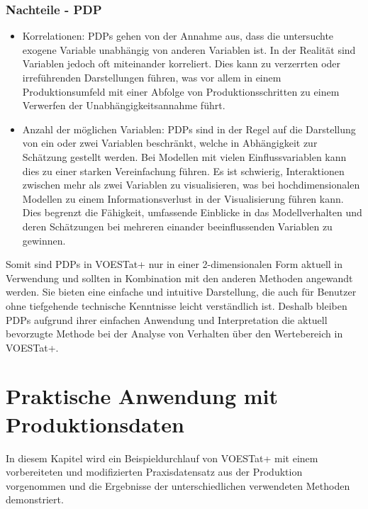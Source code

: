 \documentclass[12pt,titlepage,oneside]{book}
\begin{document}
\subsection{Nachteile - PDP}
\begin{itemize}
    \item Korrelationen: PDPs gehen von der Annahme aus, dass die untersuchte exogene Variable unabhängig von anderen Variablen ist. In der Realität sind Variablen jedoch oft miteinander korreliert. Dies kann zu verzerrten oder irreführenden Darstellungen führen, was vor allem in einem Produktionsumfeld mit einer Abfolge von Produktionsschritten zu einem Verwerfen der Unabhängigkeitsannahme führt. 
    \item Anzahl der möglichen Variablen: PDPs sind in der Regel auf die Darstellung von ein oder zwei Variablen beschränkt, welche in Abhängigkeit zur Schätzung gestellt werden. Bei Modellen mit vielen Einflussvariablen kann dies zu einer starken Vereinfachung führen. Es ist schwierig, Interaktionen zwischen mehr als zwei Variablen zu visualisieren, was bei hochdimensionalen Modellen zu einem Informationsverlust in der Visualisierung führen kann. Dies begrenzt die Fähigkeit, umfassende Einblicke in das Modellverhalten und deren Schätzungen bei mehreren einander beeinflussenden Variablen zu gewinnen.

\end{itemize}
Somit sind PDPs in VOESTat+ nur in einer 2-dimensionalen Form aktuell in Verwendung und sollten in Kombination mit den anderen Methoden angewandt werden. Sie bieten eine einfache und intuitive Darstellung, die auch für Benutzer ohne tiefgehende technische Kenntnisse leicht verständlich ist. 
Deshalb bleiben PDPs aufgrund ihrer einfachen Anwendung und Interpretation die aktuell bevorzugte Methode bei der Analyse von Verhalten über den Wertebereich in VOESTat+.

\pagebreak
\chapter{Praktische Anwendung mit Produktionsdaten}
In diesem Kapitel wird ein Beispieldurchlauf von VOESTat+ mit einem vorbereiteten und modifizierten Praxisdatensatz aus der Produktion vorgenommen und die Ergebnisse der unterschiedlichen verwendeten Methoden demonstriert.
\end{document}
